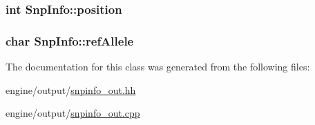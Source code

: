 \label{classSnpInfo_a0eda22dd7438af3aed0ff4a6ed66c5a2}
\hypertarget{classSnpInfo_a591c2bc650f6108b2e6ce0088ca1c8ca}{
\subsubsection[{position}]{\setlength{\rightskip}{0pt plus 5cm}int {\bf SnpInfo::position}}}
\label{classSnpInfo_a591c2bc650f6108b2e6ce0088ca1c8ca}
\hypertarget{classSnpInfo_a7bb6397cd3bbc9461b0b2bf5390bf2b1}{
\subsubsection[{refAllele}]{\setlength{\rightskip}{0pt plus 5cm}char {\bf SnpInfo::refAllele}}}
\label{classSnpInfo_a7bb6397cd3bbc9461b0b2bf5390bf2b1}


The documentation for this class was generated from the following files:\begin{DoxyCompactItemize}
\item 
engine/output/\hyperlink{snpinfo__out_8hh}{snpinfo\_\-out.hh}\item 
engine/output/\hyperlink{snpinfo__out_8cpp}{snpinfo\_\-out.cpp}\end{DoxyCompactItemize}

